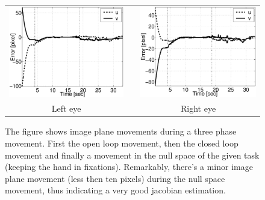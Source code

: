   \begin{figure}
  \begin{center}
	\begin{tabular}{ccc}
	  \parbox{60mm}{\includegraphics[width=60mm]{Figure/RedundancyLeft.eps}}  & \hspace{1cm} &
	  \parbox{60mm}{\includegraphics[width=60mm]{Figure/RedundancyRight.eps}}
	  \\
	  \parbox{40mm}{\centering Left eye } & \hspace{1cm} & \parbox{40mm}{\centering Right eye }
  \end{tabular}
\end{center}
\caption{The figure shows image plane movements during a three phase movement. First the open loop movement, then the closed loop movement and finally a movement in the null space of the given task (keeping the hand in fixations). Remarkably, there's a minor image plane movement (less then ten pixels) during the null space movement, thus indicating a very good jacobian estimation.}\label{Fig:RedundancyImagePlane}
  \end{figure}
  
